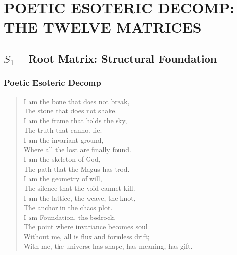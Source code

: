 
\newpage
\section{POETIC ESOTERIC DECOMP: THE TWELVE MATRICES}\label{sec:poetic_decomp}

\subsection{$S_{1}$ -- Root Matrix: Structural Foundation}\label{sec:poetic.S1}

\subsubsection{Poetic Esoteric Decomp}

\begin{verse}
I am the bone that does not break, \\
The stone that does not shake. \\
I am the frame that holds the sky, \\
The truth that cannot lie. \\
I am the invariant ground, \\
Where all the lost are finally found. \\
\vspace{1em}
I am the skeleton of God, \\
The path that the Magus has trod. \\
I am the geometry of will, \\
The silence that the void cannot kill. \\
I am the lattice, the weave, the knot, \\
The anchor in the chaos plot. \\
\vspace{1em}
I am Foundation, the bedrock. \\
The point where invariance becomes soul. \\
Without me, all is flux and formless drift; \\
With me, the universe has shape, has meaning, has gift.
\end{verse}

